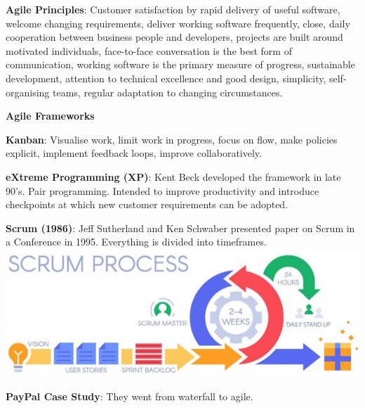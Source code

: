     \textbf{Agile Principles}: Customer satisfaction by rapid delivery of useful software, welcome changing requirements, deliver working software frequently, close, daily cooperation between business people and developers, projects are built around motivated individuals, face-to-face conversation is the best form of communication, working software is the primary measure of progress, sustainable development, attention to technical excellence and good design, simplicity, self-organising teams, regular adaptation to changing circumstances.

    \textbf{Agile Frameworks}

        \textbf{Kanban}: Visualise work, limit work in progress, focus on flow, make policies explicit, implement feedback loops, improve collaboratively.

        \textbf{eXtreme Programming (XP)}: Kent Beck developed the framework in late 90's. Pair programming. Intended to improve productivity and introduce checkpoints at which new customer requirements can be adopted.

        \textbf{Scrum (1986)}: Jeff Sutherland and Ken Schwaber presented paper on Scrum in a Conference in 1995. Everything is divided into timeframes.
        \includegraphics[width=\linewidth]{figs/SCR-20240605-payc.png}

        \textbf{PayPal Case Study}: They went from waterfall to agile.
